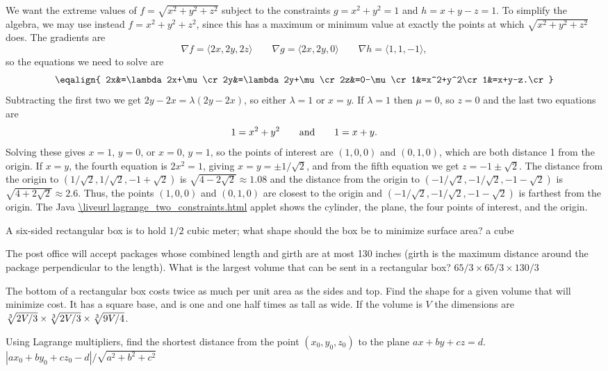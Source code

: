 We want the extreme values of $f=\sqrt{x^2+y^2+z^2}$ subject to the
constraints  $g=x^2+y^2=1$ and $h=x+y-z=1$. To simplify the algebra,
we may use instead $f=x^2+y^2+z^2$, since this has a maximum or
minimum value at exactly the points at which $\sqrt{x^2+y^2+z^2}$ does.
The gradients are
$$\nabla f =\langle 2x,2y,2z\rangle\qquad
\nabla g = \langle 2x,2y,0\rangle\qquad
\nabla h = \langle 1,1,-1\rangle,$$
so the equations we need to solve are
$$\eqalign{
2x&=\lambda 2x+\mu\cr
2y&=\lambda 2y+\mu\cr
2z&=0-\mu\cr
1&=x^2+y^2\cr
1&=x+y-z.\cr
}$$
Subtracting the first two we get
$2y-2x=\lambda(2y-2x)$, so either $\lambda=1$ or $x=y$. If $\lambda=1$
then $\mu=0$, so $z=0$ and the last two equations are
$$1=x^2+y^2\qquad\hbox{and}\qquad 1=x+y.$$
Solving these gives $x=1$, $y=0$, or $x=0$, $y=1$, so the points of
interest are $(1,0,0)$ and $(0,1,0)$, which are both distance 1 from
the origin. If $x=y$, the fourth equation is $2x^2=1$, giving 
$x=y=\pm1/\sqrt2$, and from the fifth equation we get
$z=-1\pm\sqrt2$. The distance from the origin to 
$(1/\sqrt2,1/\sqrt2,-1+\sqrt2)$ is $\sqrt{4-2\sqrt2}\approx 1.08$ and
the distance from the origin to 
$(-1/\sqrt2,-1/\sqrt2,-1-\sqrt2)$ is $\sqrt{4+2\sqrt2}\approx 2.6$.
Thus, the points $(1,0,0)$ and $(0,1,0)$ are closest to the origin and 
$(-1/\sqrt2,-1/\sqrt2,-1-\sqrt2)$ is farthest from the origin.
The Java 
\expandafter\url\expandafter{\liveurl lagrange_two_constraints.html}%
applet \endurl shows the cylinder, the plane, the four points of
interest, and the origin.
\endexample

\exercises

\exercise A six-sided rectangular box is to hold $1/2$ cubic meter;
what shape should the box be to minimize surface area?
\answer a cube
\endanswer
\endexercise

\exercise The post office will accept packages whose combined length
and girth are at most 130 inches (girth is the maximum distance around
the package perpendicular to the length). What is the largest volume
that can be sent in a rectangular box?
\answer $65/3\times 65/3\times 130/3$
\endanswer
\endexercise

\exercise The bottom of a rectangular box costs twice as much per unit
area as the sides and top. Find the shape for a given volume that will
minimize cost.
\answer It has a square base, and is one and one half times as tall as wide.
If the volume is $V$ the dimensions are $\root 3 \of {2V/3}\times
\root 3 \of {2V/3}\times \root 3\of {9V/4}$.
\endanswer
\endexercise

\exercise Using Lagrange multipliers, find the shortest
distance from the point $(x_0,y_0,z_0)$ to the plane $ax+by+cz=d$.
\answer $|ax_0+by_0+cz_0-d|/\sqrt{a^2+b^2+c^2}$
\endanswer
\endexercise

